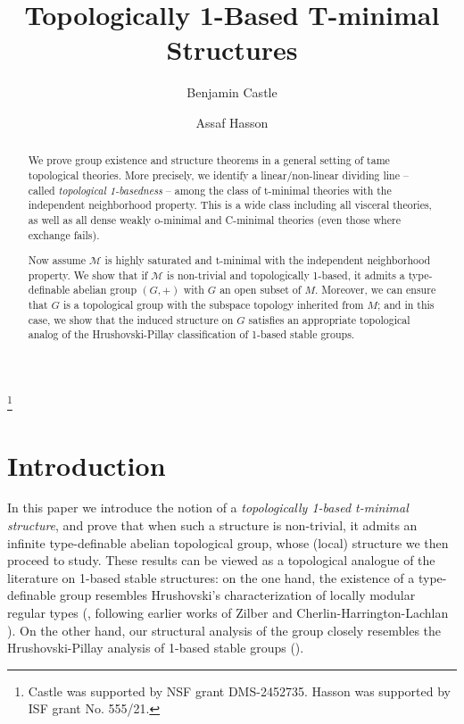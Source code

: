 \documentclass{amsart}
\theoremstyle{definition}
\begin{document}
\title{Topologically 1-Based T-minimal Structures}
\author{Benjamin Castle}
\address{Department of Mathematics, University of Illinois Urbana-Champaign}

\author{Assaf Hasson}
\address{Department of Mathematics, Ben Gurion University of the Negev, Be'er-Sheva, Israel}

\address{School of Philosophy, Fudan University,
Shanghai 200433, P.R. China}

\thanks{Castle was supported by NSF grant DMS-2452735. Hasson was supported by ISF grant No. 555/21.}


\maketitle

\begin{abstract}
    We prove group existence and structure theorems in a general setting of tame topological theories. More precisely, we identify a linear/non-linear dividing line -- called \textit{topological 1-basedness} -- among the class of t-minimal theories with the independent neighborhood property. This is a wide class including all visceral theories, as well as all dense weakly o-minimal and C-minimal theories (even those where exchange fails). 
    
    Now assume $\mathcal M$ is highly saturated and t-minimal with the independent neighborhood property. We show that if $\mathcal M$ is non-trivial and topologically 1-based, it admits a type-definable abelian group $(G,+)$ with $G$ an open subset of $M$. Moreover, we can ensure that $G$ is a topological group with the subspace topology inherited from $M$; and in this case, we show that the induced structure on $G$ satisfies an appropriate topological analog of the Hrushovski-Pillay classification of 1-based stable groups. 
\end{abstract}

\tableofcontents



\section{Introduction}

In this paper we introduce the notion of a \textit{topologically 1-based t-minimal structure}, and prove that when such a structure is non-trivial, it admits an infinite type-definable abelian topological group, whose (local) structure we then proceed to study. These results can be viewed as a topological analogue of the literature on 1-based stable structures: on the one hand, the existence of a type-definable group resembles Hrushovski's characterization of locally modular regular types (\cite{Hr4}, following earlier works of Zilber \cite[\S 3]{ZilBook} and Cherlin-Harrington-Lachlan \cite{CHL}). On the other hand, our structural analysis of the group closely resembles the Hrushovski-Pillay analysis of 1-based stable groups (\cite{HrPi87}). 
\end{document}
